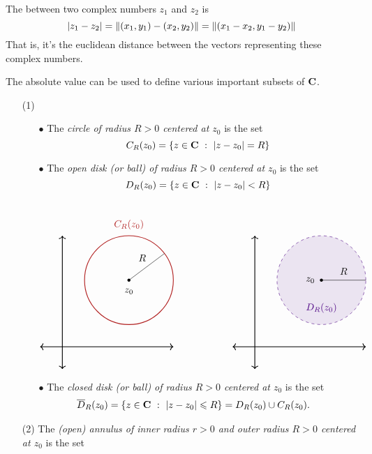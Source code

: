 \medskip

\begin{definition}[Distance]
The  between two complex numbers $z_1$ and $z_2$ is \[\left\lvert z_1 - z_2\right\rvert = \left\lVert(x_1,y_1) - (x_2,y_2)\right\rVert = \left\lVert(x_1 - x_2,y_1 - y_2)\right\rVert\]
That is, it's the euclidean distance between the vectors representing these complex numbers. 
\end{definition}

\medskip

\begin{discussion}\label{firstdomain}
The absolute value can be used to define various important subsets of $\mathbf C$.
\begin{itemize}[itemsep=1em]
\item[(1)]
\begin{itemize}[itemsep=1em]
\item[$\bullet$] The \emph{circle of radius $R>0$ centered at $z_0$} is the set
\[C_R(z_0) = \left\{z\in \mathbf C\ :\ \left\lvert z-z_0\right\rvert=R\right\}\]
\item[$\bullet$] The \emph{open disk (or ball) of radius $R>0$ centered at $z_0$} is the set
\[D_R(z_0) = \left\{z\in \mathbf C\ :\ \left\lvert z-z_0\right\rvert< R\right\}\]\\[-1em]
\[\begin{tikzpicture}[scale=0.8]
    \draw[<->,thick] (-1,0)--(5,0);
	\draw[<->,thick] (0,-1)--(0,5);
    \draw[thick,firebrick](3,3) circle (2);
    \draw[](3,3)--(4.6,4.2);
    \fill (3,3) circle (2pt);
    \node[] at (3,2.5) {$z_0$};
    \node[] at (3,5.5) {\color{firebrick}$C_R(z_0)$};
    \node[] at (3.6,4) {$R$};
  \end{tikzpicture}
  \qquad \qquad \qquad
  \begin{tikzpicture}[scale=0.8]
    \draw[<->,thick] (-1,0)--(5,0);
	\draw[<->,thick] (0,-1)--(0,5);
	\filldraw[indigo,fill opacity=1/10,dashed](3,3) circle (2);
    \draw[](3,3)--(5,3);
    \fill (3,3) circle (2pt);
    \node[] at (2.5,3) {$z_0$};
    \node[] at (3,1.75) {\color{indigo}$D_R(z_0)$};
    \node[] at (4,3.4) {$R$};
  \end{tikzpicture}\]
\item[$\bullet$] The \emph{closed disk (or ball) of radius $R>0$ centered at $z_0$} is the set
\begin{align*}
\overline{D}_R(z_0) &= \left\{z\in \mathbf C\ :\ \left\lvert z-z_0\right\rvert \leqslant R\right\} = D_R(z_0) \cup C_R(z_0).
\end{align*}
\end{itemize}
\item[(2)] The \emph{(open) annulus of inner radius $r>0$ and outer radius $R>0$ centered at $z_0$} is the set

\end{itemize}
\end{discussion}

